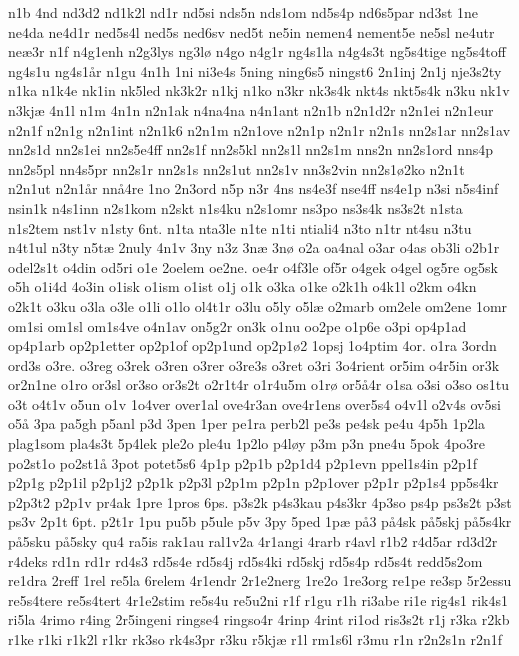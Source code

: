 {n1b
4nd
nd3d2
nd1k2l
nd1r
nd5si
nds5n
nds1om
nd5s4p
nd6s5par
nd3st
1ne
ne4da
ne4d1r
ned5s4l
ned5s
ned6sv
ned5t
ne5in
nemen4
nement5e
ne5sl
ne4utr
ne^^e63r
n1f
n4g1enh
n2g3lys
ng3l^^f8
n4go
n4g1r
ng4s1la
n4g4s3t
ng5s4tige
ng5s4toff
ng4s1u
ng4s1^^e5r
n1gu
4n1h
1ni
ni3e4s
5ning
ning6s5
ningst6
2n1inj
2n1j
nje3s2ty
n1ka
n1k4e
nk1in
nk5led
nk3k2r
n1kj
n1ko
n3kr
nk3s4k
nkt4s
nkt5s4k
n3ku
nk1v
n3kj^^e6
4n1l
n1m
4n1n
n2n1ak
n4na4na
n4n1ant
n2n1b
n2n1d2r
n2n1ei
n2n1eur
n2n1f
n2n1g
n2n1int
n2n1k6
n2n1m
n2n1ove
n2n1p
n2n1r
n2n1s
nn2s1ar
nn2s1av
nn2s1d
nn2s1ei
nn2s5e4ff
nn2s1f
nn2s5kl
nn2s1l
nn2s1m
nns2n
nn2s1ord
nns4p
nn2s5pl
nn4s5pr
nn2s1r
nn2s1s
nn2s1ut
nn2s1v
nn3s2vin
nn2s1^^f82ko
n2n1t
n2n1ut
n2n1^^e5r
nn^^e54re
1no
2n3ord
n5p
n3r
4ns
ns4e3f
nse4ff
ns4e1p
n3si
n5s4inf
nsin1k
n4s1inn
n2s1kom
n2skt
n1s4ku
n2s1omr
ns3po
ns3s4k
ns3s2t
n1sta
n1s2tem
nst1v
n1sty
6nt.
n1ta
nta3le
n1te
n1ti
ntiali4
n3to
n1tr
nt4su
n3tu
n4t1ul
n3ty
n5t^^e6
2nuly
4n1v
3ny
n3z
3n^^e6
3n^^f8
o2a
oa4nal
o3ar
o4as
ob3li
o2b1r
odel2s1t
o4din
od5ri
o1e
2oelem
oe2ne.
oe4r
o4f3le
of5r
o4gek
o4gel
og5re
og5sk
o5h
o1i4d
4o3in
o1isk
o1ism
o1ist
o1j
o1k
o3ka
o1ke
o2k1h
o4k1l
o2km
o4kn
o2k1t
o3ku
o3la
o3le
o1li
o1lo
ol4t1r
o3lu
o5ly
o5l^^e6
o2marb
om2ele
om2ene
1omr
om1si
om1sl
om1s4ve
o4n1av
on5g2r
on3k
o1nu
oo2pe
o1p6e
o3pi
op4p1ad
op4p1arb
op2p1etter
op2p1of
op2p1und
op2p1^^f82
1opsj
1o4ptim
4or.
o1ra
3ordn
ord3s
o3re.
o3reg
o3rek
o3ren
o3rer
o3re3s
o3ret
o3ri
3o4rient
or5im
o4r5in
or3k
or2n1ne
o1ro
or3sl
or3so
or3s2t
o2r1t4r
o1r4u5m
o1r^^f8
or5^^e54r
o1sa
o3si
o3so
os1tu
o3t
o4t1v
o5un
o1v
1o4ver
over1al
ove4r3an
ove4r1ens
over5s4
o4v1l
o2v4s
ov5si
o5^^e5
3pa
pa5gh
p5anl
p3d
3pen
1per
pe1ra
perb2l
pe3s
pe4sk
pe4u
4p5h
1p2la
plag1som
pla4s3t
5p4lek
ple2o
ple4u
1p2lo
p4l^^f8y
p3m
p3n
pne4u
5pok
4po3re
po2st1o
po2st1^^e5
3pot
potet5s6
4p1p
p2p1b
p2p1d4
p2p1evn
ppel1s4in
p2p1f
p2p1g
p2p1il
p2p1j2
p2p1k
p2p3l
p2p1m
p2p1n
p2p1over
p2p1r
p2p1s4
pp5s4kr
p2p3t2
p2p1v
pr4ak
1pre
1pros
6ps.
p3s2k
p4s3kau
p4s3kr
4p3so
ps4p
ps3s2t
p3st
ps3v
2p1t
6pt.
p2t1r
1pu
pu5b
p5ule
p5v
3py
5ped
1p^^e6
p^^e53
p^^e54sk
p^^e55skj
p^^e55s4kr
p^^e55sku
p^^e55sky
qu4
ra5is
rak1au
ral1v2a
4r1angi
4rarb
r4avl
r1b2
r4d5ar
rd3d2r
r4deks
rd1n
rd1r
rd4s3
rd5s4e
rd5s4j
rd5s4ki
rd5skj
rd5s4p
rd5s4t
redd5s2om
re1dra
2reff
1rel
re5la
6relem
4r1endr
2r1e2nerg
1re2o
1re3org
re1pe
re3sp
5r2essu
re5s4tere
re5s4tert
4r1e2stim
re5s4u
re5u2ni
r1f
r1gu
r1h
ri3abe
ri1e
rig4s1
rik4s1
ri5la
4rimo
r4ing
2r5ingeni
ringse4
ringso4r
4rinp
4rint
ri1od
ris3s2t
r1j
r3ka
r2kb
r1ke
r1ki
r1k2l
r1kr
rk3so
rk4s3pr
r3ku
r5kj^^e6
r1l
rm1s6l
r3mu
r1n
r2n2s1n
r2n1f
}
